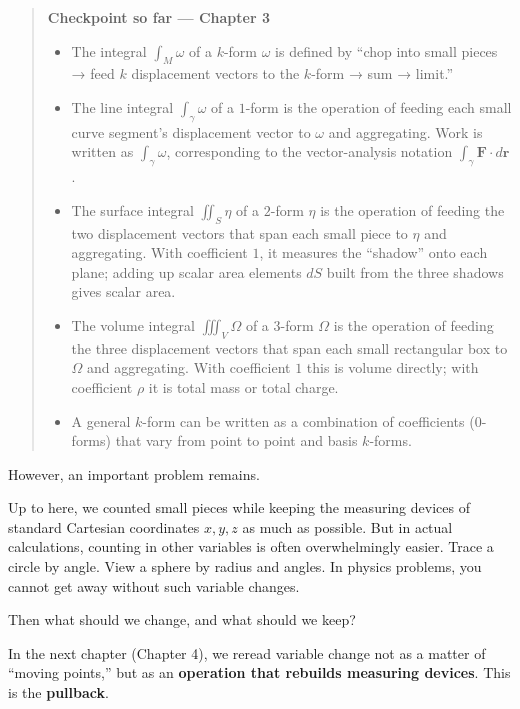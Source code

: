 \begin{quote}
\textbf{Checkpoint so far — Chapter 3}

\begin{itemize}
\item
  The integral \(\int_M \omega\) of a \(k\)-form \(\omega\) is defined
  by ``chop into small pieces → feed \(k\) displacement vectors to the
  \(k\)-form → sum → limit.''
\item
  The line integral \(\int_\gamma \omega\) of a \(1\)-form is the
  operation of feeding each small curve segment's displacement vector to
  \(\omega\) and aggregating. Work is written as \(\int_\gamma \omega\),
  corresponding to the vector-analysis notation
  \(\int_\gamma \mathbf{F}\cdot d\mathbf{r}\).
\item
  The surface integral \(\iint_S \eta\) of a \(2\)-form \(\eta\) is the
  operation of feeding the two displacement vectors that span each small
  piece to \(\eta\) and aggregating. With coefficient \(1\), it measures
  the ``shadow'' onto each plane; adding up scalar area elements \(dS\)
  built from the three shadows gives scalar area.
\item
  The volume integral \(\iiint_V \Omega\) of a \(3\)-form \(\Omega\) is
  the operation of feeding the three displacement vectors that span each
  small rectangular box to \(\Omega\) and aggregating. With coefficient
  \(1\) this is volume directly; with coefficient \(\rho\) it is total
  mass or total charge.
\item
  A general \(k\)-form can be written as a combination of coefficients
  (\(0\)-forms) that vary from point to point and basis \(k\)-forms.
\end{itemize}
\end{quote}

However, an important problem remains.

Up to here, we counted small pieces while keeping the measuring devices
of standard Cartesian coordinates \(x, y, z\) as much as possible. But
in actual calculations, counting in other variables is often
overwhelmingly easier. Trace a circle by angle. View a sphere by radius
and angles. In physics problems, you cannot get away without such
variable changes.

Then what should we change, and what should we keep?

In the next chapter (Chapter 4), we reread variable change not as a
matter of ``moving points,'' but as an
\textbf{operation that rebuilds measuring devices}. This is the
\textbf{pullback}.

